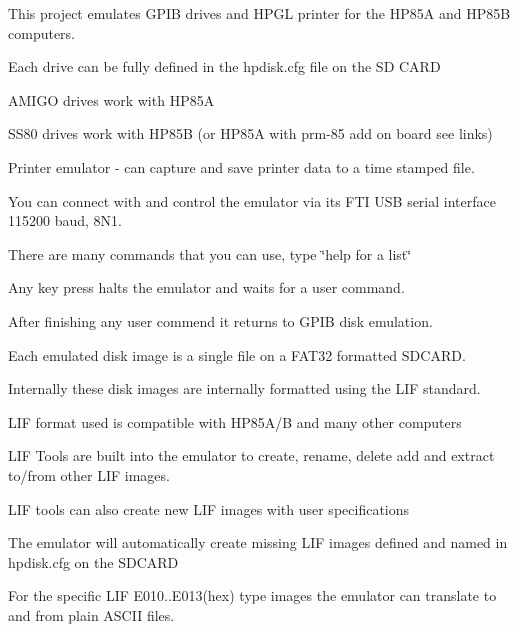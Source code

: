 \begin{DoxyItemize}
\item This project emulates G\+P\+IB drives and H\+P\+GL printer for the H\+P85A and H\+P85B computers.
\begin{DoxyItemize}
\item Each drive can be fully defined in the hpdisk.\+cfg file on the SD C\+A\+RD
\item A\+M\+I\+GO drives work with H\+P85A
\item S\+S80 drives work with H\+P85B (or H\+P85A with prm-\/85 add on board see links)
\item Printer emulator -\/ can capture and save printer data to a time stamped file.
\item You can connect with and control the emulator via its F\+TI U\+SB serial interface 115200 baud, 8\+N1.
\begin{DoxyItemize}
\item There are many commands that you can use, type \char`\"{}help for a list\char`\"{}
\item Any key press halts the emulator and waits for a user command.
\item After finishing any user commend it returns to G\+P\+IB disk emulation.
\end{DoxyItemize}
\item Each emulated disk image is a single file on a F\+A\+T32 formatted S\+D\+C\+A\+RD.
\begin{DoxyItemize}
\item Internally these disk images are internally formatted using the L\+IF standard.
\begin{DoxyItemize}
\item L\+IF format used is compatible with H\+P85\+A/B and many other computers
\end{DoxyItemize}
\item L\+IF Tools are built into the emulator to create, rename, delete add and extract to/from other L\+IF images.
\begin{DoxyItemize}
\item L\+IF tools can also create new L\+IF images with user specifications
\end{DoxyItemize}
\item The emulator will automatically create missing L\+IF images defined and named in hpdisk.\+cfg on the S\+D\+C\+A\+RD
\item For the specific L\+IF E010..E013(hex) type images the emulator can translate to and from plain A\+S\+C\+II files.

\end{DoxyItemize}
\end{DoxyItemize}
\end{DoxyItemize}
